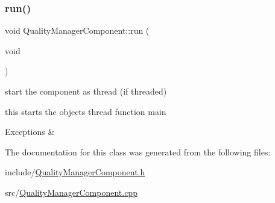\subsubsection{\texorpdfstring{run()}{run()}}
{\footnotesize\ttfamily void Quality\+Manager\+Component\+::run (\begin{DoxyParamCaption}\item[{void}]{ }\end{DoxyParamCaption})\hspace{0.3cm}{\ttfamily [virtual]}}



start the component as thread (if threaded) 

this starts the objects thread function main 
\begin{DoxyExceptions}{Exceptions}
{\em } & \\
\hline
\end{DoxyExceptions}


The documentation for this class was generated from the following files\+:\begin{DoxyCompactItemize}
\item 
include/\hyperlink{QualityManagerComponent_8h}{Quality\+Manager\+Component.\+h}\item 
src/\hyperlink{QualityManagerComponent_8cpp}{Quality\+Manager\+Component.\+cpp}\end{DoxyCompactItemize}
